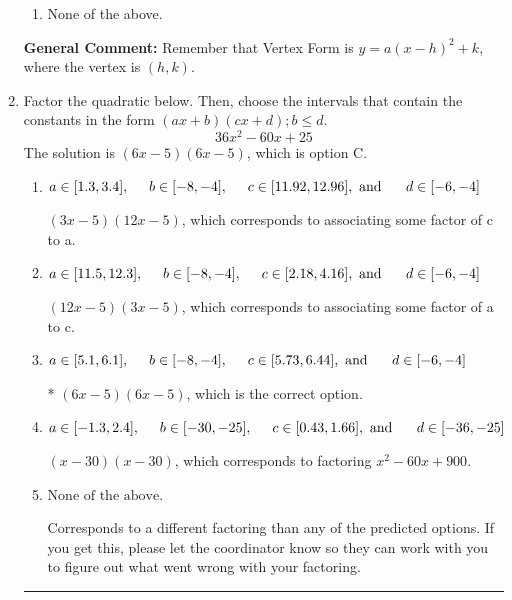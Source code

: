 \documentclass{extbook}[14pt]
\newcommand{\litem}[1]{\item #1

\rule{\textwidth}{0.4pt}}
\begin{document}
\begin{enumerate}
{\begin{enumerate}[label=\Alph*.]
\begin{multicols}{2}
\end{multicols}\item None of the above.\end{enumerate}
\textbf{General Comment:} Remember that Vertex Form is $y = a(x-h)^2+k$, where the vertex is $(h, k)$.
}
\litem{
Factor the quadratic below. Then, choose the intervals that contain the constants in the form $(ax+b)(cx+d); b \leq d.$
\[ 36x^{2} -60 x + 25 \]The solution is \( (6x -5)(6x -5) \), which is option C.\begin{enumerate}[label=\Alph*.]
\item \( a \in [1.3, 3.4], \hspace*{5mm} b \in [-8, -4], \hspace*{5mm} c \in [11.92, 12.96], \text{ and } \hspace*{5mm} d \in [-6, -4] \)

 $(3x -5)(12x -5)$, which corresponds to associating some factor of c to a.
\item \( a \in [11.5, 12.3], \hspace*{5mm} b \in [-8, -4], \hspace*{5mm} c \in [2.18, 4.16], \text{ and } \hspace*{5mm} d \in [-6, -4] \)

 $(12x -5)(3x -5)$, which corresponds to associating some factor of a to c.
\item \( a \in [5.1, 6.1], \hspace*{5mm} b \in [-8, -4], \hspace*{5mm} c \in [5.73, 6.44], \text{ and } \hspace*{5mm} d \in [-6, -4] \)

* $(6x -5)(6x -5)$, which is the correct option.
\item \( a \in [-1.3, 2.4], \hspace*{5mm} b \in [-30, -25], \hspace*{5mm} c \in [0.43, 1.66], \text{ and } \hspace*{5mm} d \in [-36, -25] \)

 $(x -30)(x -30)$, which corresponds to factoring $x^{2} -60 x + 900$.
\item \( \text{None of the above.} \)

 Corresponds to a different factoring than any of the predicted options. If you get this, please let the coordinator know so they can work with you to figure out what went wrong with your factoring.
\end{enumerate}

}
\end{enumerate}
\end{document}

